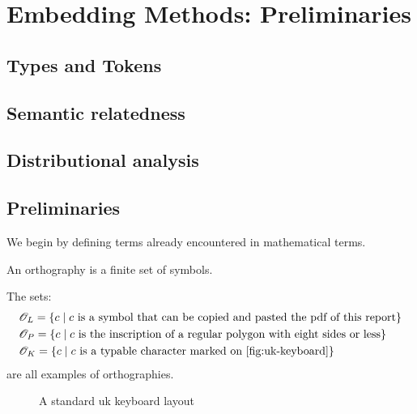 \chapter{Embedding Methods: Preliminaries}
\section{Types and Tokens}
\section{Semantic relatedness}

\section{Distributional analysis}
\section{Preliminaries}

We begin by defining terms already encountered in mathematical terms.

\begin{definition}[Orthography]\label{def:orthography}
  An orthography is a finite set of symbols.
\end{definition}

\begin{example}\label{ex:orthographies}
  The sets:
  \begin{align}
    &\mathscr{O}_L=\{c\mid\text{$c$ is a symbol that can be copied and pasted the pdf of this report}\}\label{eq:orth-doc}\\
    &\mathscr{O}_P=\{c\mid\text{$c$ is the inscription of a regular polygon with eight sides or less}\}\label{eq:orth-shape}\\
    &\mathscr{O}_K=\{c\mid\text{$c$ is a typable character marked on \autoref{fig:uk-keyboard}}\}\label{eq:orth-keyboard}
  \end{align}
  are all examples of orthographies.
\end{example}
\vspace{6pt}

\begin{figure}[ht]
 \centering
 
 \caption{A standard uk keyboard layout}
 \label{fig:uk-keyboard}
\end{figure}

